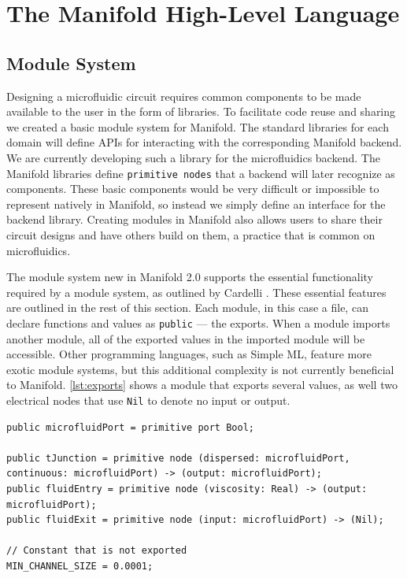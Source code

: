 \section{The Manifold High-Level Language}

\subsection{Module System}

Designing a microfluidic circuit requires common components to be made available to the user in the 
form of libraries. To facilitate code reuse and sharing we created a basic module system for Manifold.
The standard libraries for each domain will define APIs for interacting with the corresponding Manifold
backend. We are currently developing such a library for the microfluidics backend. The Manifold libraries
define \texttt{primitive nodes} that a backend will later recognize as components. These basic
components would be very difficult or impossible to represent natively in Manifold,
so instead we simply define an interface for the backend library. Creating
modules in Manifold also allows users to share their circuit designs and have
others build on them, a practice that is common on microfluidics.

The module system new in Manifold 2.0 supports the essential functionality required by a module system,
as outlined by Cardelli \cite{Cardelli:1997:PFL:263699.263735}. These
essential features are outlined in the rest of this section. Each module, in this case a file, can
declare functions and values as \texttt{public} --- the exports. When a module imports another
module, all of the exported values in the imported module will be
accessible. Other programming languages, such as Simple ML, feature more exotic module systems, but this
additional complexity is not currently beneficial to Manifold. \autoref{lst:exports} shows a module
that exports several values, as well two
electrical nodes that use \texttt{Nil} to denote no input or output.

\begin{lstlisting}[label=lst:exports, caption=Exported values in a Manifold file]
public microfluidPort = primitive port Bool;

public tJunction = primitive node (dispersed: microfluidPort, continuous: microfluidPort) -> (output: microfluidPort);
public fluidEntry = primitive node (viscosity: Real) -> (output: microfluidPort);
public fluidExit = primitive node (input: microfluidPort) -> (Nil);

// Constant that is not exported
MIN_CHANNEL_SIZE = 0.0001;
\end{lstlisting}

